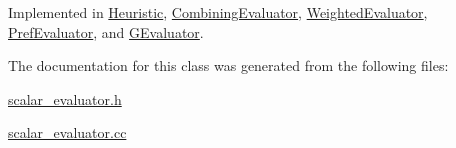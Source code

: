 Implemented in \hyperlink{classHeuristic_a0b9a7302390591c08ccc6ff9daede82c}{Heuristic}, \hyperlink{classCombiningEvaluator_acaba3e4f6375cba36fedbefe5a9bdea1}{Combining\-Evaluator}, \hyperlink{classWeightedEvaluator_a16979bda79ed15f11ae9d59f3fd47c78}{Weighted\-Evaluator}, \hyperlink{classPrefEvaluator_a296a47eed8a2f814145f51a2e400be9e}{Pref\-Evaluator}, and \hyperlink{classGEvaluator_a66fec06acc1c4cc4351a99cfc1040c2e}{G\-Evaluator}.



The documentation for this class was generated from the following files\-:\begin{DoxyCompactItemize}
\item 
\hyperlink{scalar__evaluator_8h}{scalar\-\_\-evaluator.\-h}\item 
\hyperlink{scalar__evaluator_8cc}{scalar\-\_\-evaluator.\-cc}\end{DoxyCompactItemize}
